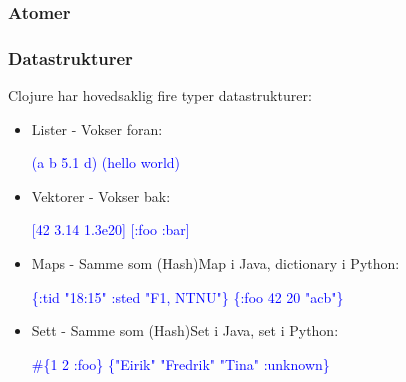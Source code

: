 \documentclass{beamer}
\begin{document}
\begin{frame}
  \frametitle{Atomer}
\begin{semiverbatim}


 \textcolor{blue}{ 
 
}





\end{semiverbatim}
\end{frame}

\begin{frame}[fragile]
  \frametitle{Datastrukturer}
  Clojure har hovedsaklig fire typer datastrukturer:
\begin{itemize}
\item<2-> Lister - Vokser foran:
\begin{semiverbatim}
\textcolor{blue}{(a\visible<-7>{\alert<7>{,}} b\visible<-7>{\alert<7>{,}} 5.1 d) (hello world)}
\end{semiverbatim}
\item<3-> Vektorer - Vokser bak:
\begin{semiverbatim}
\textcolor{blue}{[42\visible<-7>{\alert<7>{,}} 3.14 1.3e20] [:foo :bar]}
\end{semiverbatim}
\item<4-> Maps - Samme som (Hash)Map i Java, dictionary i Python:
\begin{semiverbatim}
\textcolor{blue}{\{:tid "18:15"\visible<-7>{\alert<7>{,}} :sted "F1, NTNU"\} \{:foo 42 20 "acb"\}}
\end{semiverbatim}
\item<5-> Sett - Samme som (Hash)Set i Java, set i Python:
\begin{semiverbatim}
\textcolor{blue}{#\{1\visible<-7>{\alert<7>{,}} 2 :foo\} \{"Eirik" "Fredrik" "Tina" :unknown\}}
\end{semiverbatim}
\end{itemize}
\end{frame}
\end{document}
